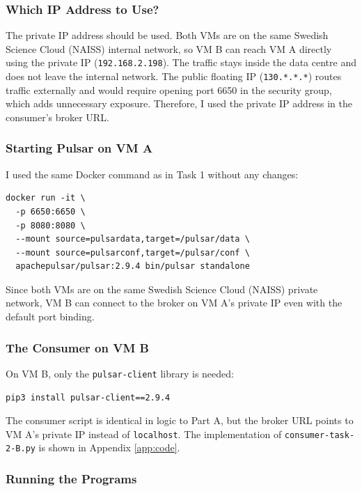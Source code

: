\documentclass[11pt,a4paper]{article}
\begin{document}
\subsubsection{Which IP Address to Use?}

The private IP address should be used. Both VMs are on the same Swedish Science Cloud
(NAISS) internal network, so VM B can reach VM A directly using the private IP
(\texttt{192.168.2.198}). The traffic stays inside the data centre and does not leave
the internal network. The public floating IP (\texttt{130.*.*.*}) routes traffic externally
and would require opening port 6650 in the security group, which adds unnecessary
exposure. Therefore, I used the private IP address in the consumer's broker URL.

\subsubsection{Starting Pulsar on VM A}

I used the same Docker command as in Task 1 without any changes:

\begin{lstlisting}[style=shell, caption={Starting Pulsar on VM A -- same command as Task 1}]
docker run -it \
  -p 6650:6650 \
  -p 8080:8080 \
  --mount source=pulsardata,target=/pulsar/data \
  --mount source=pulsarconf,target=/pulsar/conf \
  apachepulsar/pulsar:2.9.4 bin/pulsar standalone
\end{lstlisting}

Since both VMs are on the same Swedish Science Cloud (NAISS) private network, VM B can connect to the broker
on VM A's private IP even with the default port binding.

\subsubsection{The Consumer on VM B}
On VM B, only the \texttt{pulsar-client} library is needed:

\begin{lstlisting}[style=shell]
pip3 install pulsar-client==2.9.4
\end{lstlisting}

The consumer script is identical in logic to Part A, but the broker URL points to
VM A's private IP instead of \texttt{localhost}.
The implementation of \texttt{consumer-task-2-B.py} is shown in Appendix \ref{app:code}.


\subsubsection{Running the Programs}
\end{document}
